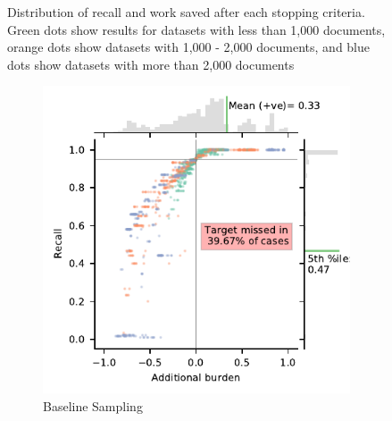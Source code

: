 \documentclass{bmcart}
\begin{document}
\begin{figure}
	\caption{\small Distribution of recall and work saved after each stopping criteria. Green dots show results for datasets with less than 1,000 documents, orange dots show datasets with 1,000 - 2,000 documents, and blue dots show datasets with more than 2,000 documents} 
	\label{recall-wss}
\end{figure}

\begin{figure}
	\centering
	\begin{subfigure}[b]{0.475\textwidth}
		\centering
		\includegraphics[width=\textwidth]{../images/jointplot_burden_bir}
		\caption[Network2]%
		{{\small Baseline Sampling}}    
		\label{fig:bir_ab}
	\end{subfigure}
	\hfill
	\begin{subfigure}[b]{0.475\textwidth}  
		\centering 

\end{subfigure}
\end{figure}
\end{document}
